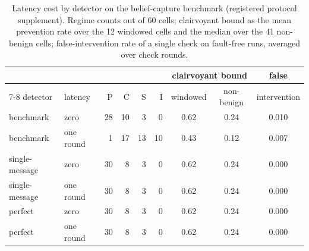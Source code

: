 \documentclass[pdflatex,sn-mathphys-num]{sn-jnl}
\theoremstyle{thmstyleone}%
\begin{document}
\begin{table}[!tbp]
  \caption{Latency cost by detector on the belief-capture benchmark (registered protocol supplement). Regime counts out of 60 cells; clairvoyant bound as the mean prevention rate over the 12 windowed cells and the median over the 41 non-benign cells; false-intervention rate of a single check on fault-free runs, averaged over check rounds.}
  \label{tab:latency}
  \small
  \setlength{\tabcolsep}{4pt}
  \begin{tabular}{@{}llrrrrccc@{}}
    \toprule
    & & & & & & \multicolumn{2}{c}{clairvoyant bound} & false \\
    \cmidrule(lr){7-8}
    detector & latency & P & C & S & I & windowed & non-benign & intervention \\
    \midrule
    benchmark & zero & 28 & 10 & 3 & 0 & 0.62 & 0.24 & 0.010 \\
    benchmark & one round & 1 & 17 & 13 & 10 & 0.43 & 0.12 & 0.007 \\
    single-message & zero & 30 & 8 & 3 & 0 & 0.62 & 0.24 & 0.000 \\
    single-message & one round & 30 & 8 & 3 & 0 & 0.62 & 0.24 & 0.000 \\
    perfect & zero & 30 & 8 & 3 & 0 & 0.62 & 0.24 & 0.000 \\
    perfect & one round & 30 & 8 & 3 & 0 & 0.62 & 0.24 & 0.000 \\
    \bottomrule
  \end{tabular}
\end{table}
\end{document}

